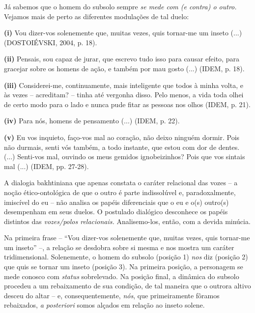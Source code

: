 Já sabemos que o homem do subsolo sempre \emph{se mede com (e contra) o
outro.} Vejamos mais de perto as diferentes modulações de tal duelo:

\textbf{(i)} Vou dizer-vos solenemente que, muitas vezes, quis tornar-me
um inseto (...) (DOSTOIÉVSKI, 2004, p. 18).

\textbf{(ii)} Pensais, sou capaz de jurar, que escrevo tudo isso para
causar efeito, para gracejar sobre os homens de ação, e também por mau
gosto (...) (IDEM, p. 18).

\textbf{(iii)} Considerei-me, continuamente, mais inteligente que todos
à minha volta, e às vezes -- acreditam? -- tinha até vergonha disso.
Pelo menos, a vida toda olhei de certo modo para o lado e nunca pude
fitar as pessoas nos olhos (IDEM, p. 21).

\textbf{(iv)} Para nós, homens de pensamento (...) (IDEM, p. 22).

\textbf{(v)} Eu vos inquieto, faço-vos mal ao coração, não deixo ninguém
dormir. Pois não durmais, senti vós também, a todo instante, que estou
com dor de dentes. (...) Senti-vos mal, ouvindo os meus gemidos
ignobeizinhos? Pois que vos sintais mal (...) (IDEM, pp. 27-28).

A dialogia bakhtiniana que apenas constata o caráter relacional das
vozes -- a noção ético-ontológica de que o outro é parte indissolúvel e,
paradoxalmente, imiscível do eu -- não analisa os papéis diferenciais
que o eu e o(s) outro(s) desempenham em seus duelos. O postulado
dialógico desconhece os papéis distintos das \emph{vozes/polos
relacionais.} Analisemo-los, então, com a devida minúcia.

Na primeira frase -- ``Vou dizer-vos solenemente que, muitas vezes, quis
tornar-me um inseto'' --, a relação se desdobra sobre si mesma e nos
mostra um caráter tridimensional. Solenemente, o homem do subsolo
(posição 1) \emph{nos} diz (posição 2) que quis se tornar um inseto
(posição 3). Na primeira posição, a personagem se mede conosco com
\emph{status} sobrelevado. Na posição final, a dinâmica do subsolo
procedeu a um rebaixamento de sua condição, de tal maneira que o outrora
altivo desceu do altar -- e, consequentemente, \emph{nós}, que
primeiramente fôramos rebaixados, \emph{a posteriori} somos alçados em
relação ao inseto solene.

